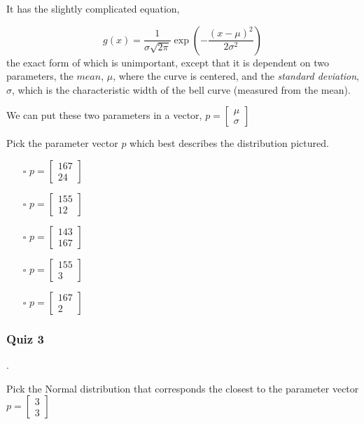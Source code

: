 \documentclass[]{article}
\begin{document}
It has the slightly complicated equation,

\begin{equation}
	g(x) = \frac{1}{\sigma\sqrt{2\pi}}\exp\left(-\frac{(x-
		\mu)^2}{2\sigma^2}\right)
\end{equation}
the exact form of which is unimportant, except that it is dependent on two parameters, the $ mean $, $ \mu $, where the curve is centered, and the \textit{standard deviation}, $ \sigma $, which is the characteristic width of the bell curve (measured from the mean).

We can put these two parameters in a vector, $ p = \begin{bmatrix}
\mu \\
\sigma
\end{bmatrix} $

Pick the parameter vector $ p $ which best describes the distribution pictured.

\begin{itemize}
	\item[$\square$] $ p = \begin{bmatrix}
		167 \\
		24
		\end{bmatrix} $
	\item[$\square$] $ p = \begin{bmatrix}
		155 \\
		12
		\end{bmatrix} $
	\item[$\square$] $ p = \begin{bmatrix}
		143 \\
		167
		\end{bmatrix} $
	\item[$\square$] $ p = \begin{bmatrix}
		155 \\
		3
		\end{bmatrix} $
	\item[$\square$] $ p = \begin{bmatrix}
		167 \\
		2
		\end{bmatrix} $
\end{itemize}

\subsubsection{Quiz 3}.

Pick the Normal distribution that corresponds the closest to the parameter vector $ p= \begin{bmatrix}
3 \\
3
\end{bmatrix} $
\end{document}
